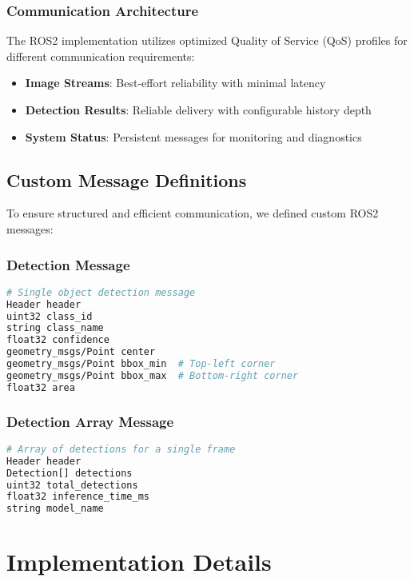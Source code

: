 \documentclass[12pt,a4paper]{article}
\begin{document}
\subsubsection{Communication Architecture}

The ROS2 implementation utilizes optimized Quality of Service (QoS) profiles for different communication requirements:

\begin{itemize}
    \item \textbf{Image Streams}: Best-effort reliability with minimal latency
    \item \textbf{Detection Results}: Reliable delivery with configurable history depth
    \item \textbf{System Status}: Persistent messages for monitoring and diagnostics
\end{itemize}

\subsection{Custom Message Definitions}

To ensure structured and efficient communication, we defined custom ROS2 messages:

\subsubsection{Detection Message}
\begin{lstlisting}[language=bash, caption=Detection.msg Structure]
# Single object detection message
Header header
uint32 class_id
string class_name
float32 confidence
geometry_msgs/Point center
geometry_msgs/Point bbox_min  # Top-left corner
geometry_msgs/Point bbox_max  # Bottom-right corner
float32 area
\end{lstlisting}

\subsubsection{Detection Array Message}
\begin{lstlisting}[language=bash, caption=DetectionArray.msg Structure]
# Array of detections for a single frame
Header header
Detection[] detections
uint32 total_detections
float32 inference_time_ms
string model_name
\end{lstlisting}

\section{Implementation Details}
\end{document}
